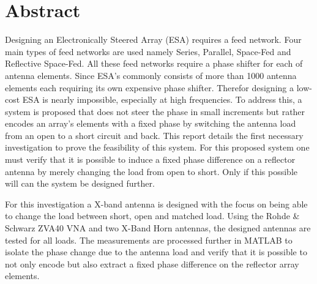 %
%
%


\chapter*{Abstract}
Designing an Electronically Steered Array (ESA) requires a feed network. Four main types of feed networks are used namely Series, Parallel, Space-Fed and Reflective Space-Fed. All these feed networks require a phase shifter for each of antenna elements. Since ESA’s commonly consists of more than 1000 antenna elements each requiring its own expensive phase shifter. Therefor designing a low-cost ESA is nearly impossible, especially at high frequencies. To address this, a system is proposed that does not steer the phase in small increments but rather encodes an array’s elements with a fixed phase by switching the antenna load from an open to a short circuit and back. This report details the first necessary investigation to prove the feasibility of this system. For this proposed system one must verify that it is possible to induce a fixed phase difference on a reflector antenna by merely changing the load from open to short.  Only if this possible will can the system be designed further. 

For this investigation a X-band antenna is designed with the focus on being able to change the load between short, open and matched load. Using the Rohde \& Schwarz ZVA40 VNA and two X-Band Horn antennas, the designed antennas are tested for all loads. The measurements are processed further in MATLAB to isolate the phase change due to the antenna load and verify that it is possible to not only encode but also extract a fixed phase difference on the reflector array elements.

\ifstandalone
% 
\fi
%